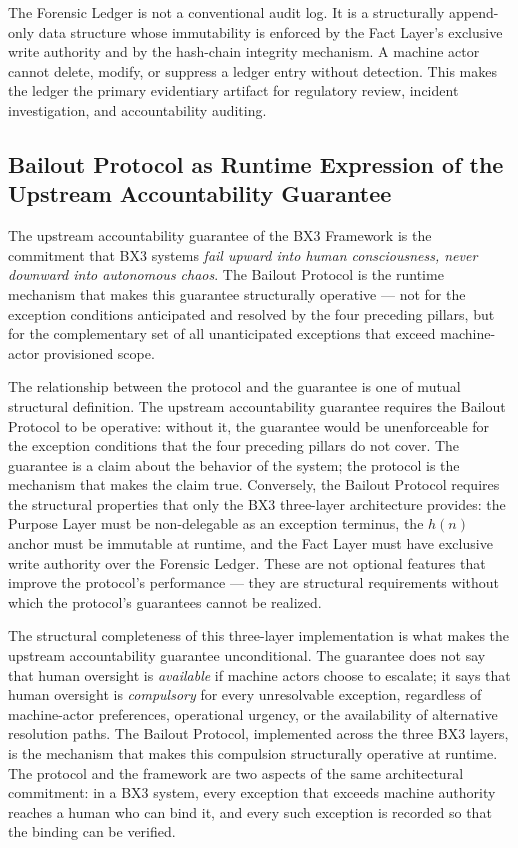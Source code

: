 The Forensic Ledger is not a conventional audit log. It is a structurally append-only data structure whose immutability is enforced by the Fact Layer's exclusive write authority and by the hash-chain integrity mechanism. A machine actor cannot delete, modify, or suppress a ledger entry without detection. This makes the ledger the primary evidentiary artifact for regulatory review, incident investigation, and accountability auditing.

\subsection{Bailout Protocol as Runtime Expression of the Upstream Accountability Guarantee}\label{sec:runtime-expression}

The upstream accountability guarantee of the BX3 Framework is the commitment that BX3 systems \emph{fail upward into human consciousness, never downward into autonomous chaos}. The Bailout Protocol is the runtime mechanism that makes this guarantee structurally operative --- not for the exception conditions anticipated and resolved by the four preceding pillars, but for the complementary set of all unanticipated exceptions that exceed machine-actor provisioned scope.

The relationship between the protocol and the guarantee is one of mutual structural definition. The upstream accountability guarantee requires the Bailout Protocol to be operative: without it, the guarantee would be unenforceable for the exception conditions that the four preceding pillars do not cover. The guarantee is a claim about the behavior of the system; the protocol is the mechanism that makes the claim true. Conversely, the Bailout Protocol requires the structural properties that only the BX3 three-layer architecture provides: the Purpose Layer must be non-delegable as an exception terminus, the $h(n)$ anchor must be immutable at runtime, and the Fact Layer must have exclusive write authority over the Forensic Ledger. These are not optional features that improve the protocol's performance --- they are structural requirements without which the protocol's guarantees cannot be realized.

The structural completeness of this three-layer implementation is what makes the upstream accountability guarantee unconditional. The guarantee does not say that human oversight is \emph{available} if machine actors choose to escalate; it says that human oversight is \emph{compulsory} for every unresolvable exception, regardless of machine-actor preferences, operational urgency, or the availability of alternative resolution paths. The Bailout Protocol, implemented across the three BX3 layers, is the mechanism that makes this compulsion structurally operative at runtime. The protocol and the framework are two aspects of the same architectural commitment: in a BX3 system, every exception that exceeds machine authority reaches a human who can bind it, and every such exception is recorded so that the binding can be verified.

